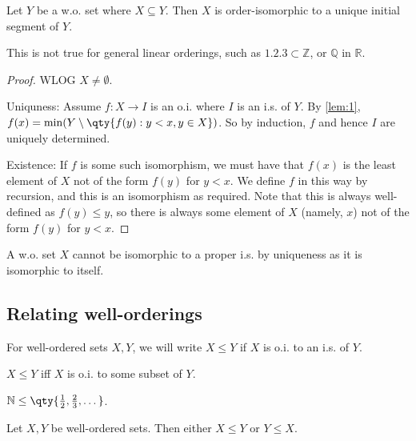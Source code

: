 \begin{proposition} \label{prp:sbs}
    Let $Y$ be a w.o. set where $X \subseteq Y$.
    Then $X$ is order-isomorphic to a unique initial segment of $Y$.
\end{proposition}
This is not true for general linear orderings, such as $\qty{1, 2, 3} \subset \mathbb Z$, or $\mathbb Q$ in $\mathbb R$.
\begin{proof}
    WLOG $X \neq \emptyset$.

    Uniquness: Assume $f : X \to I$ is an o.i. where $I$ is an i.s. of $Y$.
    By \cref{lem:1}, $f(x) = \min(Y \setminus \qty{f(y) : y < x, y \in X})$.
    So by induction, $f$ and hence $I$ are uniquely determined.

    Existence:
    If $f$ is some such isomorphism, we must have that $f(x)$ is the least element of $X$ not of the form $f(y)$ for $y < x$.
    We define $f$ in this way by recursion, and this is an isomorphism as required.
    Note that this is always well-defined as $f(y) \leq y$, so there is always some element of $X$ (namely, $x$) not of the form $f(y)$ for $y < x$.
\end{proof}

\begin{remark}
    A w.o. set $X$ cannot be isomorphic to a proper i.s. by uniqueness as it is isomorphic to itself.
\end{remark}

\subsection{Relating well-orderings}
\begin{definition}
    For well-ordered sets $X, Y$, we will write $X \leq Y$ if $X$ is o.i. to an i.s. of $Y$.
\end{definition}

$X \leq Y$ iff $X$ is o.i. to some subset of $Y$.

\begin{example}
    $\mathbb N \leq \qty{\frac{1}{2}, \frac{2}{3}, \dots}$.

\end{example}
\begin{proposition}
    Let $X, Y$ be well-ordered sets.
    Then either $X \leq Y$ or $Y \leq X$.
\end{proposition}

